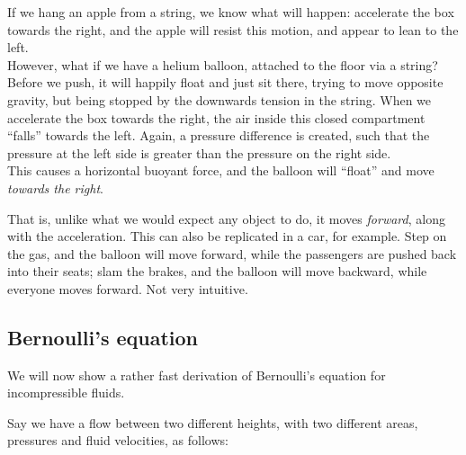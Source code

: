 If we hang an apple from a string, we know what will happen: accelerate the box towards the right, and the apple will resist this motion, and appear to lean to the left.\\
However, what if we have a helium balloon, attached to the floor via a string? Before we push, it will happily float and just sit there, trying to move opposite gravity, but being stopped by the downwards tension in the string. When we accelerate the box towards the right, the air inside this closed compartment ``falls'' towards the left. Again, a pressure difference is created, such that the pressure at the left side is greater than the pressure on the right side.\\
This causes a horizontal buoyant force, and the balloon will ``float'' and move \emph{towards the right}.

That is, unlike what we would expect any object to do, it moves \emph{forward}, along with the acceleration. This can also be replicated in a car, for example. Step on the gas, and the balloon will move forward, while the passengers are pushed back into their seats; slam the brakes, and the balloon will move backward, while everyone moves forward. Not very intuitive.

\subsection{Bernoulli's equation}

We will now show a rather fast derivation of Bernoulli's equation for incompressible fluids.

Say we have a flow between two different heights, with two different areas, pressures and fluid velocities, as follows:

\begin{figure}[H]
\centering
{}
\label{fig:my_label}
\end{figure}

